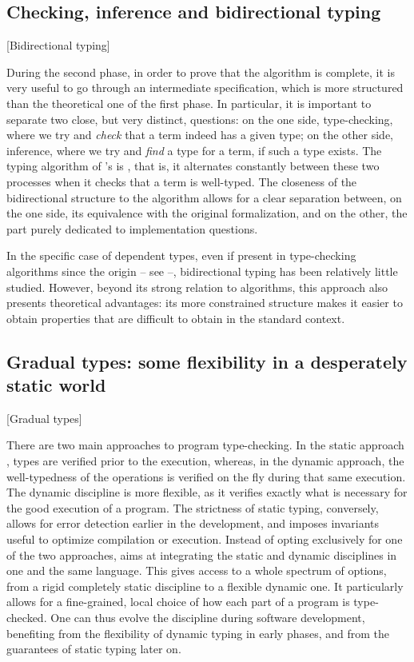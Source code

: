 \subsection{Checking, inference and bidirectional typing}[Bidirectional typing]

During the second phase, in order to prove that the algorithm is complete, it is
very useful to go through an intermediate specification, which is more structured
than the theoretical one of the first phase.
In particular, it is important to separate two close, but very distinct, questions:
on the one side, type-checking, where we try and \emph{check} that a term indeed has a
given type;
on the other side, inference, where we try and \emph{find} a type for a term, if such a
type exists.
The typing algorithm of 's  is , that is, it
alternates constantly between these two processes when it checks that a term is well-typed.
The closeness of the bidirectional structure to the algorithm allows for a
clear separation between, on the one side, its equivalence with the original formalization,
and on the other, the part purely dedicated to implementation questions.

In the specific case of dependent types, even if present in type-checking algorithms since
the origin – see \eg {} –, bidirectional typing has been relatively little
studied. However, beyond its strong relation to algorithms, this approach also presents
theoretical advantages: its more constrained structure makes it easier
to obtain properties that are difficult to obtain in the standard context.

\subsection{Gradual types: some flexibility in a desperately static world}
  [Gradual types]
\label{sec:intro-graduel-en}

There are two main approaches to program type-checking. In the static approach%
,
types are verified prior to the execution, whereas, in the dynamic approach, the well-typedness
of the operations is verified on the fly during that same execution.
The dynamic discipline is more flexible, as it verifies exactly what is necessary
for the good execution of a program.
The strictness of static typing, conversely, allows for error detection earlier in the
development, and imposes invariants useful to optimize compilation or execution.
Instead of opting exclusively for one of the two approaches,
  aims at integrating
the static and dynamic disciplines in one and the
same language. This gives access to a whole spectrum of options, from a rigid completely static
discipline to a flexible dynamic one. It particularly allows for a fine-grained, local choice
of how each part of a program is type-checked.
One can thus evolve the discipline during software development, benefiting from
the flexibility of dynamic typing in early phases, and from the guarantees of static typing
later on.

